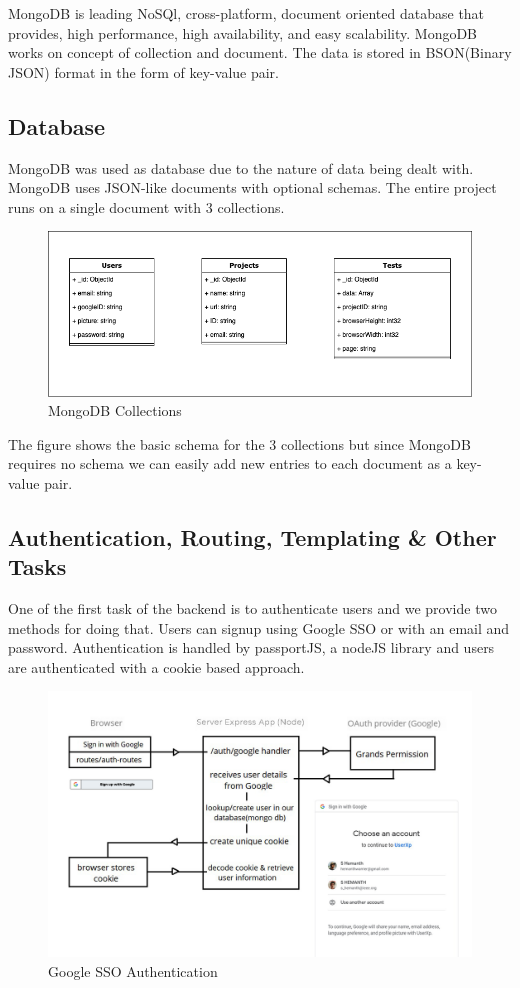 \documentclass[hidelinks,12pt,a4paper,final]{extreport}
\begin{document}
MongoDB is leading NoSQl, cross-platform, document oriented database that provides, high performance, high availability, and easy scalability. MongoDB works on concept of collection and document. The data is stored in BSON(Binary JSON) format in the form of key-value pair.

\subsection{Database}
MongoDB was used as database due to the nature of data being dealt with. MongoDB uses JSON-like documents with optional schemas. The entire project runs on a single document with 3 collections.

\begin{figure}[H]
    \centering
    \includegraphics[width=\linewidth]{db.png}
    \caption{MongoDB Collections}
\end{figure}
The figure shows the basic schema for the 3 collections but since MongoDB requires no schema we can easily add new entries to each document as a key-value pair.

\subsection{Authentication, Routing, Templating \& Other Tasks}
One of the first task of the backend is to authenticate users and we provide two methods for doing that. Users can signup using Google SSO or with an email and password. Authentication is handled by passportJS, a nodeJS library and users are authenticated with a cookie based approach.

\begin{figure}[H]
    \centering
    \includegraphics[width=\linewidth]{google-sso-auth.png}
    \caption{Google SSO Authentication}
\end{figure}
\end{document}
